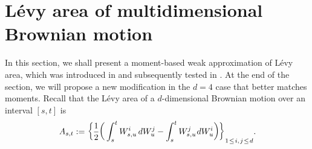 \documentclass[sn-mathphys-num]{sn-jnl}%
\newcommand{\m}{\hspace{0.25mm}}
\begin{document}
\section{L\'{e}vy area of multidimensional Brownian motion}\label{sect:space_space}

In this section, we shall present a moment-based weak approximation of L\'{e}vy area,
which was introduced in \cite{foster2020thesis} and subsequently tested in \cite{jelincic2025levygan}. At the end of the section, we will propose a new modification in the $d=4$ case that better matches moments.
Recall that the L\'{e}vy area of a $d$-dimensional Brownian motion over an interval $[s,t]$ is
\begin{align}\label{eq:levy_area}
A_{s,t} := \bigg\{\frac{1}{2}\bigg(\int_s^t W_{s,u}^i\, dW_u^j - \int_s^t W_{s,u}^j\m dW_u^i\bigg)\bigg\}_{1\m\leq\m i,\m j\m \leq\m d}.
\end{align}
\end{document}
